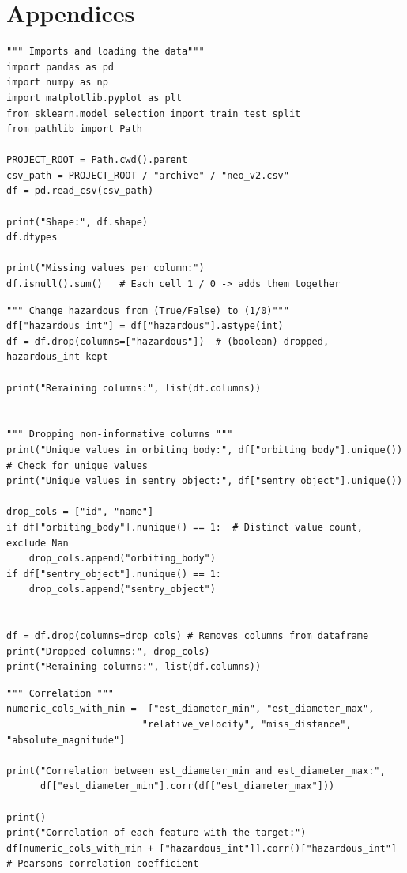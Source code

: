 \documentclass{article}
\begin{document}





\section*{Appendices}


\begin{lstlisting}
""" Imports and loading the data"""
import pandas as pd
import numpy as np
import matplotlib.pyplot as plt
from sklearn.model_selection import train_test_split
from pathlib import Path

PROJECT_ROOT = Path.cwd().parent
csv_path = PROJECT_ROOT / "archive" / "neo_v2.csv"
df = pd.read_csv(csv_path)

print("Shape:", df.shape)
df.dtypes

print("Missing values per column:")
df.isnull().sum()   # Each cell 1 / 0 -> adds them together

\end{lstlisting}

\begin{lstlisting}
""" Change hazardous from (True/False) to (1/0)"""
df["hazardous_int"] = df["hazardous"].astype(int)
df = df.drop(columns=["hazardous"])  # (boolean) dropped, hazardous_int kept

print("Remaining columns:", list(df.columns))


""" Dropping non-informative columns """
print("Unique values in orbiting_body:", df["orbiting_body"].unique())  # Check for unique values
print("Unique values in sentry_object:", df["sentry_object"].unique())

drop_cols = ["id", "name"]
if df["orbiting_body"].nunique() == 1:  # Distinct value count, exclude Nan
    drop_cols.append("orbiting_body")
if df["sentry_object"].nunique() == 1:
    drop_cols.append("sentry_object")


df = df.drop(columns=drop_cols) # Removes columns from dataframe
print("Dropped columns:", drop_cols)
print("Remaining columns:", list(df.columns))

\end{lstlisting}


\begin{lstlisting}
""" Correlation """
numeric_cols_with_min =  ["est_diameter_min", "est_diameter_max",
                        "relative_velocity", "miss_distance", "absolute_magnitude"]

print("Correlation between est_diameter_min and est_diameter_max:",
      df["est_diameter_min"].corr(df["est_diameter_max"]))

print()
print("Correlation of each feature with the target:")
df[numeric_cols_with_min + ["hazardous_int"]].corr()["hazardous_int"]    # Pearsons correlation coefficient

\end{lstlisting}
\end{document}
